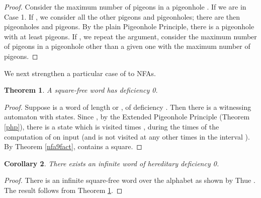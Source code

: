 \documentclass[12pt]{article}
\newcommand{\squarefree}{square-free}
\theoremstyle{plain}
\newtheorem{thm}{Theorem}
\newtheorem{cor}[thm]{Corollary}
\theoremstyle{definition}
\theoremstyle{remark}
\begin{document}
			\begin{proof}
				Consider the maximum number of pigeons in a pigeonhole . If  we are in Case 1.
				If , we consider all the other pigeons and pigeonholes;
				there are then  pigeonholes and  pigeons.
				By the plain Pigeonhole Principle, there is a pigeonhole with at least  pigeons.
				If , we repeat the argument,
				consider the maximum number of pigeons in a pigeonhole other than a given one with the maximum number
				of pigeons.
			\end{proof}
			We next strengthen a particular case of \cite[Theorem 9]{MR1897300} to NFAs.
			\begin{thm}\label{nfa9square}
				A {\squarefree} word has deficiency 0.
			\end{thm}
			\begin{proof}
				Suppose  is a word of length  or , of deficiency .
				Then there is a witnessing automaton  with  states.
				Since , by the Extended Pigeonhole Principle (Theorem \ref{php}),
				there is a state  which is visited  times , during the  times of the computation of 
				on input  (and is not visited at any other times in the interval ).
				By Theorem \ref{nfa9fact},  contains a square.
			\end{proof}
			\begin{cor}
				There exists an infinite word of hereditary deficiency 0.
			\end{cor}
			\begin{proof}
				There is an infinite {\squarefree} word over the alphabet  as shown by Thue \cite{ThueTwo}.
				The result follows from Theorem \ref{nfa9square}.
			\end{proof}
\end{document}
